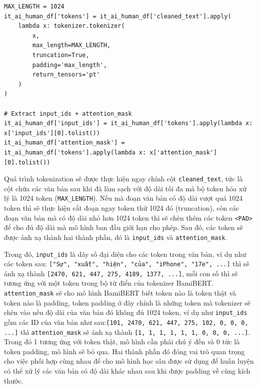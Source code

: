 \begin{lstlisting}[style=pythoncode]
MAX_LENGTH = 1024
it_ai_human_df['tokens'] = it_ai_human_df['cleaned_text'].apply(
    lambda x: tokenizer.tokenizer(
        x,
        max_length=MAX_LENGTH,
        truncation=True,
        padding='max_length',
        return_tensors='pt'
    )
)

# Extract input_ids + attention_mask
it_ai_human_df['input_ids'] = it_ai_human_df['tokens'].apply(lambda x: x['input_ids'][0].tolist())
it_ai_human_df['attention_mask'] = it_ai_human_df['tokens'].apply(lambda x: x['attention_mask'][0].tolist())
\end{lstlisting}


\vspace{\baselineskip}
Quá trình tokenization sẽ được thực hiện ngay chính cột \texttt{cleaned\_text}, tức là cột chứa các văn bản sau khi đã làm sạch với độ dài tối đa mà bộ token hóa xử lý là 1024 token (\texttt{MAX\_LENGTH}). Nếu mà đoạn văn bản có độ dài vượt quá 1024 token thì sẽ thực hiện cắt đoạn ngay token thứ 1024 đó (truncation), còn các đoạn văn bản mà có độ dài nhỏ hơn 1024 token thì
sẽ chèn thêm các token \texttt{<PAD>} để cho đủ độ dài mà mô hình ban đầu giới hạn cho phép. Sau đó, các token sẽ được ánh xạ thành hai thành phần, đó là \texttt{input\_ids} và \texttt{attention\_mask}.

\vspace{\baselineskip}
\noindent
Trong đó, \texttt{input\_ids} là dãy số đại diện cho các token trong văn bản, ví dụ như các token sau: \texttt{["Sự", "xuất", "hiện", "của", "iPhone", "17e", ...]} thì sẽ ánh xạ
thành \texttt{[2470, 621, 447, 275, 4189, 1377, ...]}, mỗi con số thì sẽ tương ứng với một token trong bộ từ điển của tokenizer BamiBERT. \texttt{attention\_mask} sẽ cho mô hình BamiBERT biết token nào là token thật và token nào là padding, token padding ở đây chính là những token mà tokenizer sẽ chèn vào nếu độ dài của văn bản đó không đủ 1024 token, ví dụ như \texttt{input\_ids} 
gồm các ID của văn bản như sau:\texttt{[101, 2470, 621, 447, 275, 102, 0, 0, 0, ...]} thì \texttt{attention\_mask} sẽ ánh xạ thành \texttt{[1, 1, 1, 1, 1, 1, 0, 0, 0, ...]}. Trong đó 1 tương ứng với token thật, mô hình cần phải chú ý đến và 0 tức là token padding, mô hình sẽ bỏ qua. Hai thành phần đó đóng vai trò quan trọng cho việc phối hợp cùng nhau để cho mô hình học sâu được sử dụng
để huấn luyện có thể xử lý các văn bản có độ dài khác nhau sau khi được padding về cùng kích thước.

